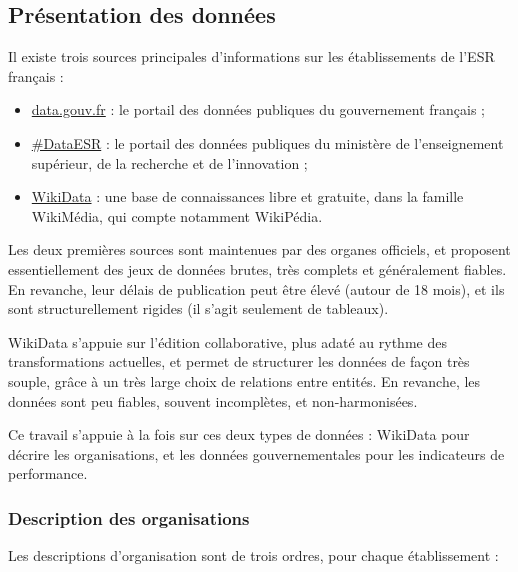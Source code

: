\documentclass[12pt,french,landscape]{article}
\providecommand{\tightlist}{%
  \setlength{\itemsep}{0pt}\setlength{\parskip}{0pt}}
\begin{document}
\begin{multicols}{2}

\newpage
\tableofcontents
\newpage
\part{Présentation des données}

Il existe trois sources principales d'informations sur les
établissements de l'ESR français :

\begin{itemize}
\tightlist
\item
  \href{https://www.data.gouv.fr/fr/}{data.gouv.fr} : le portail des
  données publiques du gouvernement français ;
\item
  \href{https://data.esr.gouv.fr/FR/}{\#DataESR} : le portail des
  données publiques du ministère de l'enseignement supérieur, de la
  recherche et de l'innovation ;
\item
  \href{https://www.wikidata.org/wiki/Wikidata:Main_Page}{WikiData} :
  une base de connaissances libre et gratuite, dans la famille
  WikiMédia, qui compte notamment WikiPédia.
\end{itemize}

Les deux premières sources sont maintenues par des organes officiels, et
proposent essentiellement des jeux de données brutes, très complets et
généralement fiables. En revanche, leur délais de publication peut être
élevé (autour de 18 mois), et ils sont structurellement rigides (il
s'agit seulement de tableaux).

WikiData s'appuie sur l'édition collaborative, plus adaté au rythme des
transformations actuelles, et permet de structurer les données de façon
très souple, grâce à un très large choix de relations entre entités. En
revanche, les données sont peu fiables, souvent incomplètes, et
non-harmonisées.

Ce travail s'appuie à la fois sur ces deux types de données : WikiData
pour décrire les organisations, et les données gouvernementales pour les
indicateurs de performance.

\hypertarget{description-des-organisations}{%
\section{Description des
organisations}\label{description-des-organisations}}

Les descriptions d'organisation sont de trois ordres, pour chaque
établissement :


\end{multicols}
\end{document}
